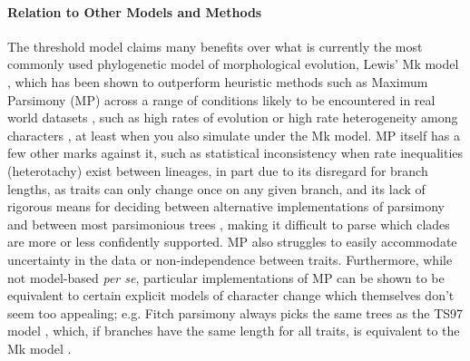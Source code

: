 \documentclass[12pt, twocolumn, twoside]{article}
\begin{document}
\paragraph{Relation to Other Models and Methods}

The threshold model claims many benefits over what is currently the most commonly used phylogenetic model of morphological evolution, Lewis’ Mk model \citep{lewisLikelihoodApproachEstimating2001a}, which has been shown to outperform heuristic methods such as Maximum Parsimony (MP) across a range of conditions likely to be encountered in real world datasets \citep{wrightBayesianAnalysisUsing2014, wrightModelingCharacterChange2016}, such as high rates of evolution or high rate heterogeneity among characters \citep{wagnerModellingRateDistributions2012}, at least when you also simulate under the Mk model. MP itself has a few other marks against it, such as statistical inconsistency when rate inequalities (heterotachy) exist between lineages, in part due to its disregard for branch lengths, as traits can only change once on any given branch, and its lack of rigorous means for deciding between alternative implementations of parsimony and between most parsimonious trees \citep{felsensteinInferringPhylogenies2004a}, making it difficult to parse which clades are more or less confidently supported. MP also struggles to easily accommodate uncertainty in the data or non-independence between traits. Furthermore, while not model-based \textit{per se}, particular implementations of MP can be shown to be equivalent to certain explicit models of character change which themselves don’t seem too appealing; e.g. Fitch parsimony \citep{fitchDefiningCourseEvolution1971} always picks the same trees as the TS97 model \citep{tuffleyLinksMaximumLikelihood1997}, which, if branches have the same length for all traits, is equivalent to the Mk model \citep{lewisLikelihoodApproachEstimating2001a, steelParsimonyLikelihoodRole2000}. 
\end{document}
